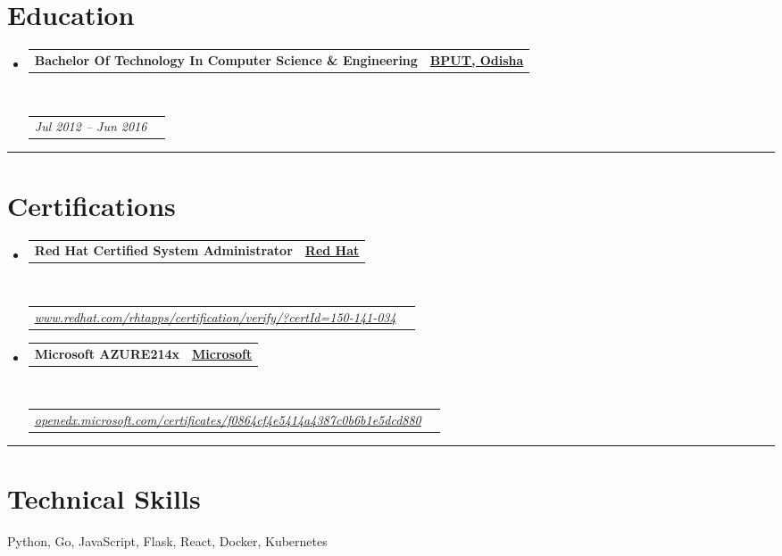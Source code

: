 \documentclass[10pt,a4paper,hidelinks]{article}
\makeatletter
\newenvironment{indentsection}[1]%
{\begin{list}{}%
	{\setlength{\leftmargin}{#1}}%
	\item[]%
}
{\end{list}}
\newcommand{\headerrow}[2]
{\begin{tabular*}{\linewidth}{l@{\extracolsep{\fill}}r}
	#1 &
	#2 \\
\end{tabular*}}
\makeatother
\begin{document}
\section*{Education}

\begin{itemize}
	\parskip=0.1em

	\item 
	\headerrow
		{\textbf{Bachelor Of Technology In Computer Science \& Engineering}}
		{{\href{http://www.bput.ac.in/}{\textbf{BPUT, Odisha}}}}
	\\
	\headerrow
		{\emph{Jul 2012 -- Jun 2016}}
		{\emph{}}

\end{itemize}


\hrule
\vspace{-0.3em}
\section*{Certifications}

\begin{itemize}
	\parskip=0.1em

	\item 
	\headerrow
		{\textbf{Red Hat Certified System Administrator}}
		{{\href{https://www.redhat.com/}{\textbf{Red Hat}}}}
	\\
	\headerrow
	    {\emph{\href{https://www.redhat.com/rhtapps/certification/verify/?certId=150-141-034}{www.redhat.com/rhtapps/certification/verify/?certId=150-141-034}}}
		{\emph{}}
	
	\item 
	\headerrow
		{\textbf{Microsoft AZURE214x}}
		{{\href{https://www.microsoft.com/}{\textbf{Microsoft}}}}
	\\
	\headerrow
	    {\emph{\href{https://openedx.microsoft.com/certificates/f0864cf4e5414a4387c0b6b1e5dcd880}{openedx.microsoft.com/certificates/f0864cf4e5414a4387c0b6b1e5dcd880}}}
		{\emph{}}

\end{itemize}


\hrule
\vspace{-0.3em}
\section*{Technical Skills}

\begin{indentsection}{\parindent}
\begin{description*}
    Python, Go, JavaScript, Flask, React, Docker, Kubernetes
\end{description*}
\end{indentsection}
\end{document}
